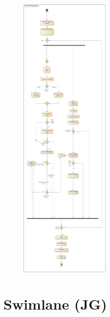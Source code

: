 \documentclass[conference]{IEEEtran}
\begin{document}
\begin{figure}[htbp]
	\includegraphics[width=0.4\textwidth]{Activity Diagram}
	\caption{}
	\label{fig:Bild1}
\end{figure}

\newpage

\section{Swimlane (JG)}
\end{document}
